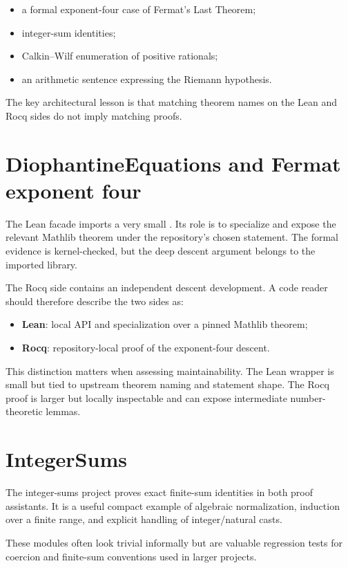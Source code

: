 \documentclass[
  10pt,
  a4paper,
  twoside,
  open=any,
  parskip=half,
  headings=big
]{scrreprt}
\newcommand{\code}[1]{\texttt{\detokenize{#1}}}
\begin{document}
\begin{itemize}
  \item a formal exponent-four case of Fermat's Last Theorem;
  \item integer-sum identities;
  \item Calkin--Wilf enumeration of positive rationals;
  \item an arithmetic sentence expressing the Riemann hypothesis.
\end{itemize}

The key architectural lesson is that matching theorem names on the Lean and
Rocq sides do not imply matching proofs.

\section{DiophantineEquations and Fermat exponent four}

The Lean facade imports a very small \code{FermatFour.lean}.  Its role is to
specialize and expose the relevant Mathlib theorem under the repository's
chosen statement.  The formal evidence is kernel-checked, but the deep descent
argument belongs to the imported library.

The Rocq side contains an independent descent development.  A code reader
should therefore describe the two sides as:

\begin{itemize}
  \item \textbf{Lean}: local API and specialization over a pinned Mathlib
        theorem;
  \item \textbf{Rocq}: repository-local proof of the exponent-four descent.
\end{itemize}

This distinction matters when assessing maintainability.  The Lean wrapper is
small but tied to upstream theorem naming and statement shape.  The Rocq proof
is larger but locally inspectable and can expose intermediate number-theoretic
lemmas.

\section{IntegerSums}

The integer-sums project proves exact finite-sum identities in both proof
assistants.  It is a useful compact example of algebraic normalization,
induction over a finite range, and explicit handling of integer/natural casts.

These modules often look trivial informally but are valuable regression tests
for coercion and finite-sum conventions used in larger projects.
\end{document}
